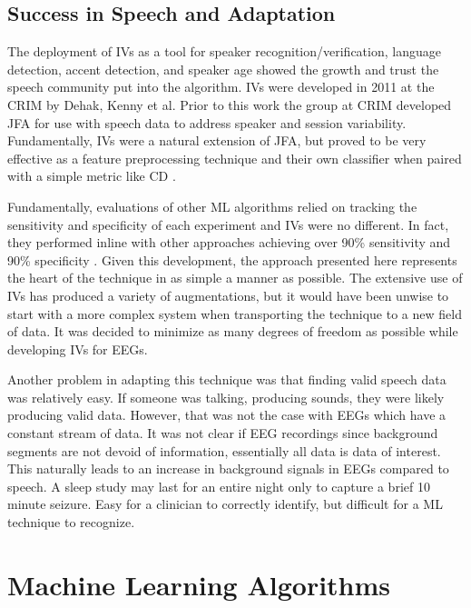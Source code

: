 \subsection{Success in Speech and Adaptation}

The deployment of \acp{IV} as a tool for speaker recognition/verification\cite{Kenny2015}, language detection\cite{Li2013a}, accent detection\cite{Behravan2015}, and speaker age\cite{Bahari2012} showed the growth and trust the speech community put into the algorithm. \acp{IV} were developed in 2011 at the \ac{CRIM} by Dehak, Kenny et al\cite{Dehak2011}. Prior to this work the group at \ac{CRIM} developed \ac{JFA} for use with speech data to address speaker and session variability\cite{Kenny2005}. Fundamentally, \acp{IV} were a natural extension of \ac{JFA}, but proved to be very effective as a feature preprocessing technique and their own classifier when paired with a simple metric like \ac{CD} \cite{Senoussaoui2010,Hasan2011}.

Fundamentally, evaluations of other \ac{ML} algorithms relied on tracking the sensitivity and specificity of each experiment and \acp{IV} were no different. In fact, they performed inline with other approaches achieving over 90\% sensitivity and 90\% specificity \cite{Greenberg2014a}. Given this development, the approach presented here represents the heart of the technique in as simple a manner as possible. The extensive use of \acp{IV} has produced a variety of augmentations, but it would have been unwise to start with a more complex system when transporting the technique to a new field of data. It was decided to minimize as many degrees of freedom as possible while developing \acp{IV} for \acp{EEG}.

Another problem in adapting this technique was that finding valid speech data was relatively easy. If someone was talking, producing sounds, they were likely producing valid data. However, that was not the case with \acp{EEG} which have a constant stream of data. It was not clear if \ac{EEG} recordings since background segments are not devoid of information, essentially all data is data of interest. This naturally leads to an increase in background signals in \acp{EEG} compared to speech. A sleep study may last for an entire night only to capture a brief 10 minute seizure. Easy for a clinician to correctly identify, but difficult for a \ac{ML} technique to recognize.

\section{Machine Learning Algorithms}

